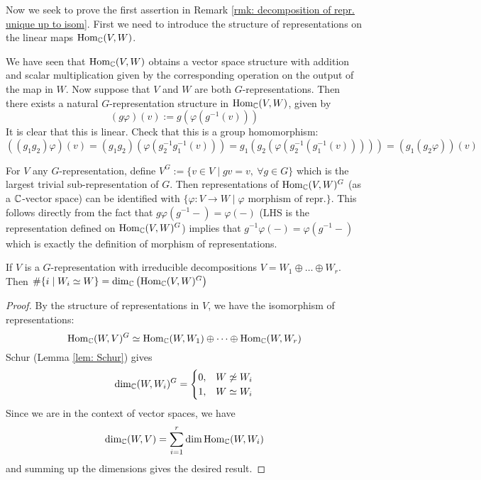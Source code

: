 \documentclass{article}
\begin{document}
\textstart
Now we seek to prove the first assertion in Remark \ref{rmk: decomposition of repr. unique up to isom}. First we need to introduce the structure of representations on the linear maps $\mathrm{Hom}_{\mathbb{C}}(V, W)$.

We have seen that $\mathrm{Hom}_{\mathbb{C}}(V, W)$ obtains a vector space structure with addition and scalar multiplication given by the corresponding operation on the output of the map in $W$. Now suppose that $V$ and $W$ are both $G$-representations. Then there exists a natural $G$-representation structure in $\mathrm{Hom}_{\mathbb{C}}(V, W)$, given by 
\[
    (g \varphi)(v) := g\left( \varphi(g^{-1}(v)) \right)
\]
It is clear that this is linear. Check that this is a group homomorphism:
\[
    ((g_1 g_2) \varphi)(v) = (g_1 g_2) (\varphi ( g_2^{-1} g_1^{-1}(v) )) = g_1\left( g_2 (\varphi(g_2^{-1}(g_1^{-1}(v)))) \right) = (g_1 (g_2 \varphi))(v)
\]

\begin{remark}
    For $V$ any $G$-representation, define $V^G := \{ v \in V \mid gv = v,\ \forall g \in G \}$ which is the largest trivial sub-representation of $G$. Then representations of $\mathrm{Hom}_{\mathbb{C}}(V, W)^G$ (as a $\mathbb{C}$-vector space) can be identified with $\{ \varphi: V \to W \mid \varphi \text{ morphism of repr.} \}$. This follows directly from the fact that $g\varphi(g^{-1} -) = \varphi(-)$ (LHS is the representation defined on $\mathrm{Hom}_{\mathbb{C}}(V, W)^G$) implies that $g^{-1}\varphi(-) = \varphi(g^{-1}-)$ which is exactly the definition of morphism of representations.
\end{remark}

\begin{corollary}
    If $V$ is a $G$-representation with irreducible decompositions $V = W_1 \oplus \dots \oplus W_r$. Then $\#\{ i \mid W_i \simeq W \} = \dim_{\mathbb{C}}\left( \mathrm{Hom}_{\mathbb{C}}(V, W)^G \right)$
\end{corollary}

\begin{proof}
    By the structure of representations in $V$, we have the isomorphism of representations:
    \[
        \mathrm{Hom}_{\mathbb{C}}(W, V)^G \simeq \mathrm{Hom}_{\mathbb{C}}(W, W_1) \oplus \dots \oplus \mathrm{Hom}_{\mathbb{C}}(W, W_r)
    \]
    Schur (Lemma \ref{lem: Schur}) gives 
    \[
        \dim_{\C}(W, W_i)^G = 
        \begin{cases}
            0, & W \nsimeq W_i \\
            1, & W \simeq W_i
        \end{cases}
    \]
    Since we are in the context of vector spaces, we have
    \[
        \dim_{\mathbb{C}}(W, V) = \sum_{i = 1}^r \dim \mathrm{Hom}_{\mathbb{C}} (W, W_i)
    \]
    and summing up the dimensions gives the desired result.
\end{proof}
\end{document}

